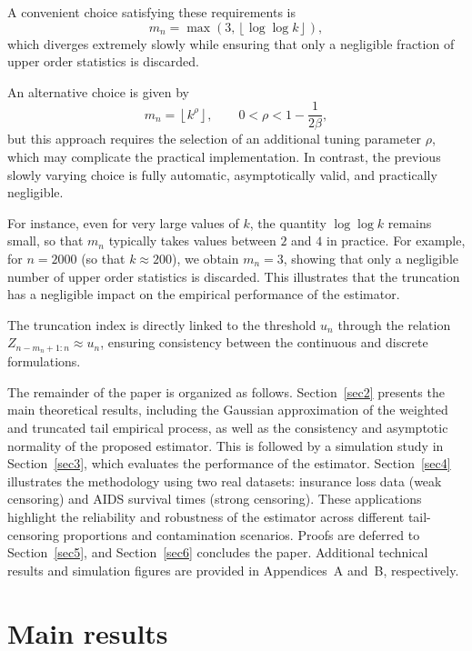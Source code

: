 \documentclass[reqno,openbib,runningheads,a4paper,12pt]{amsart}%
\begin{document}
\noindent A convenient choice satisfying these requirements is
\[
m_{n}=\max\left(  3,\left\lfloor \log\log k\right\rfloor \right)  ,
\]
which diverges extremely slowly while ensuring that only a negligible fraction
of upper order statistics is discarded.\smallskip

\noindent An alternative choice is given by
\[
m_{n}=\left\lfloor k^{\rho}\right\rfloor ,\qquad0<\rho<1-\frac{1}{2\beta},
\]
but this approach requires the selection of an additional tuning parameter
$\rho$, which may complicate the practical implementation. In contrast, the
previous slowly varying choice is fully automatic, asymptotically valid, and
practically negligible.\smallskip

\noindent For instance, even for very large values of $k$, the quantity
$\log\log k$ remains small, so that $m_{n}$ typically takes values between $2$
and $4$ in practice. For example, for $n=2000$ (so that $k\approx200$), we
obtain $m_{n}=3$, showing that only a negligible number of upper order
statistics is discarded. This illustrates that the truncation has a negligible
impact on the empirical performance of the estimator.\smallskip

\noindent The truncation index is directly linked to the threshold $u_{n}$
through the relation $Z_{n-m_{n}+1:n}\approx u_{n}$, ensuring consistency
between the continuous and discrete formulations.\smallskip

\noindent The remainder of the paper is organized as follows.
Section~\ref{sec2} presents the main theoretical results, including the
Gaussian approximation of the weighted and truncated tail empirical process,
as well as the consistency and asymptotic normality of the proposed estimator.
This is followed by a simulation study in Section~\ref{sec3}, which evaluates
the performance of the estimator. Section~\ref{sec4} illustrates the
methodology using two real datasets: insurance loss data (weak censoring) and
AIDS survival times (strong censoring). These applications highlight the
reliability and robustness of the estimator across different tail-censoring
proportions and contamination scenarios. Proofs are deferred to
Section~\ref{sec5}, and Section~\ref{sec6} concludes the paper. Additional
technical results and simulation figures are provided in Appendices~A and~B, respectively.

\section{\textbf{Main results}\label{sec2}}
\end{document}
